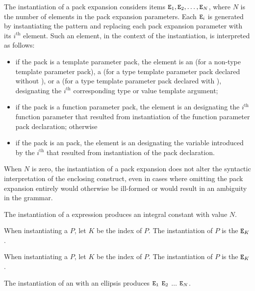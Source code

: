 \pnum
The instantiation of a pack expansion considers
items $\texttt{\protect E}_1, \texttt{\protect E}_2, \dotsc, \texttt{\protect E}_N$,
where
$N$ is the number of elements in the pack expansion parameters.
Each $\texttt{\protect E}_i$ is generated by instantiating the pattern and
replacing each pack expansion parameter with its $i^\text{th}$ element.
Such an element, in the context of the instantiation, is interpreted as
follows:
\begin{itemize}
\item
if the pack is a template parameter pack, the element is
an 
(for a non-type template parameter pack),
a 
(for a type template parameter pack declared without ), or
a 
(for a type template parameter pack declared with ),
designating the $i^\text{th}$ corresponding type or value template argument;

\item
if the pack is a function parameter pack, the element is an
designating the $i^\text{th}$ function parameter
that resulted from instantiation of
the function parameter pack declaration;
otherwise

\item
if the pack is an  pack,
the element is an 
designating the variable introduced by
the $i^\text{th}$ 
that resulted from instantiation of
the  pack declaration.
\end{itemize}
When $N$ is zero, the instantiation of a pack expansion
does not alter the syntactic interpretation of the enclosing construct,
even in cases where omitting the pack expansion entirely would
otherwise be ill-formed or would result in an ambiguity in the grammar.

\pnum
The instantiation of a  expression produces
an integral constant with value $N$.

\pnum
When instantiating a  $P$,
let $K$ be the index of $P$.
The instantiation of $P$ is the  $\texttt{\protect E}_K$.

\pnum
When instantiating a  $P$,
let $K$ be the index of $P$.
The instantiation of $P$ is the  $\texttt{\protect E}_K$.

\pnum
The instantiation of an  with an ellipsis
produces $\texttt{\protect E}_1$ $\texttt{\protect E}_2$ $\dotsc$ $\texttt{\protect E}_N$.

